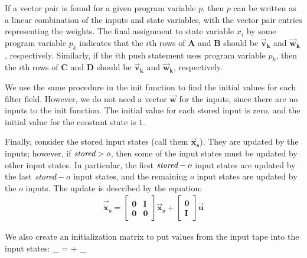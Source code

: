 If a vector pair is found for a given program variable $p$, then $p$
can be written as a linear combination of the inputs and state
variables, with the vector pair entries representing the weights.  The
final assignment to state variable $x_i$ by some program variable
$p_k$ indicates that the $i$th rows of $\mathbf{A}$ and $\mathbf{B}$
should be $\vec{\mathbf{v}}_\mathbf{k}$ and
$\vec{\mathbf{w}}_\mathbf{k}$, respectively. Similarly, if the $i$th
push statement uses program variable $p_k$, then the $i$th rows of
$\mathbf{C}$ and $\mathbf{D}$ should be $\vec{\mathbf{v}}_\mathbf{k}$
and $\vec{\mathbf{w}}_\mathbf{k}$, respectively.

We use the same procedure in the init function to find the initial
values for each filter field.  However, we do not need a vector
$\vec{\mathbf{w}}$ for the inputs, since there are no inputs to the
init function. The initial value for each stored input is zero, and
the initial value for the constant state is $1$.

Finally, consider the stored input states (call them
$\vec{\mathbf{x}}_\mathbf{s}$). They are updated by the inputs;
however, if $\mbox{\it stored} > o$, then some of the input states must be
updated by other input states. In particular, the first $\mbox{\it stored}-o$
input states are updated by the last $\mbox{\it stored}-o$ input states, and the
remaining $o$ input states are updated by the $o$ inputs. The update
is described by the equation:
\begin{eqnarray}
\label{eq:one}
\vec{\dot{\mathbf{x}}}_\mathbf{s} = \left [
\begin{array} {cc} \mathbf{0} & \mathbf{I} \\ \mathbf{0} &
\mathbf{0} \end{array} \right ] \vec{\mathbf{x}}_\mathbf{s} + \left [
\begin{array} {c} \mathbf{0} \\ \mathbf{I} \end{array} \right ]
\vec{\mathbf{u}}
\end{eqnarray}

We also create an initialization matrix to put values from the input
tape into the input states:
\starteqnstar
{}_ =  +
 _
\doneeqnstar


